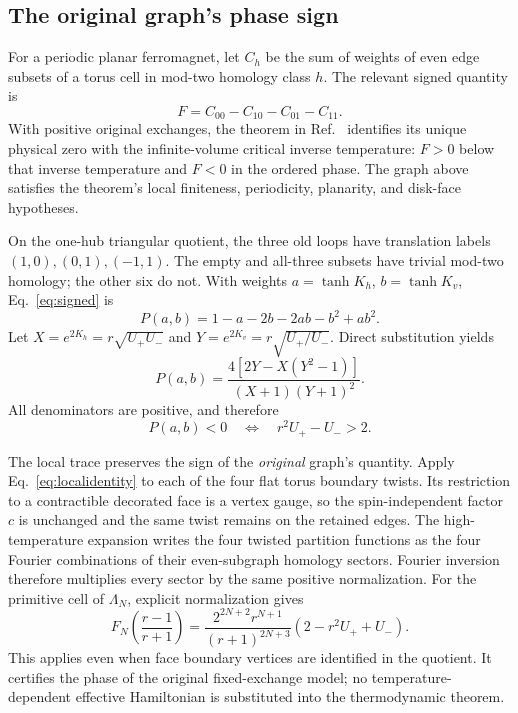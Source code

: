 \documentclass[aps,pre,reprint,amsmath,amssymb,nofootinbib,longbibliography,floatfix]{revtex4-2}
\newcommand{\Fan}{\Lambda_N}
\begin{document}
\subsection{The original graph's phase sign}
For a periodic planar ferromagnet, let \(C_h\) be the sum of weights of even edge subsets of a torus cell in mod-two homology class \(h\). The relevant signed quantity is
\begin{equation}
 F=C_{00}-C_{10}-C_{01}-C_{11}.
 \label{eq:signed}
\end{equation}
With positive original exchanges, the theorem in Ref.~\cite{CimasoniDuminilCopin2013} identifies its unique physical zero with the infinite-volume critical inverse temperature: \(F>0\) below that inverse temperature and \(F<0\) in the ordered phase. The graph above satisfies the theorem's local finiteness, periodicity, planarity, and disk-face hypotheses.

On the one-hub triangular quotient, the three old loops have translation labels \((1,0),(0,1),(-1,1)\). The empty and all-three subsets have trivial mod-two homology; the other six do not. With weights \(a=\tanh K_h\), \(b=\tanh K_v\), Eq.~\eqref{eq:signed} is
\begin{equation}
 P(a,b)=1-a-2b-2ab-b^2+ab^2.
 \label{eq:triangleP}
\end{equation}
Let \(X=e^{2K_h}=r\sqrt{U_+U_-}\) and \(Y=e^{2K_v}=r\sqrt{U_+/U_-}\). Direct substitution yields
\begin{equation}
 P(a,b)=
 \frac{4[2Y-X(Y^2-1)]}{(X+1)(Y+1)^2}.
\end{equation}
All denominators are positive, and therefore
\begin{equation}
 P(a,b)<0\quad\Longleftrightarrow\quad r^2U_+-U_->2.
 \label{eq:criterion}
\end{equation}

The local trace preserves the sign of the \emph{original} graph's quantity. Apply Eq.~\eqref{eq:localidentity} to each of the four flat torus boundary twists. Its restriction to a contractible decorated face is a vertex gauge, so the spin-independent factor \(c\) is unchanged and the same twist remains on the retained edges. The high-temperature expansion writes the four twisted partition functions as the four Fourier combinations of their even-subgraph homology sectors. Fourier inversion therefore multiplies every sector by the same positive normalization. For the primitive cell of \(\Fan\), explicit normalization gives
\begin{equation}
 F_N\!\left(\frac{r-1}{r+1}\right)
 =\frac{2^{2N+2}r^{N+1}}{(r+1)^{2N+3}}
       (2-r^2U_++U_-).
 \label{eq:originalF}
\end{equation}
This applies even when face boundary vertices are identified in the quotient. It certifies the phase of the original fixed-exchange model; no temperature-dependent effective Hamiltonian is substituted into the thermodynamic theorem.
\end{document}
